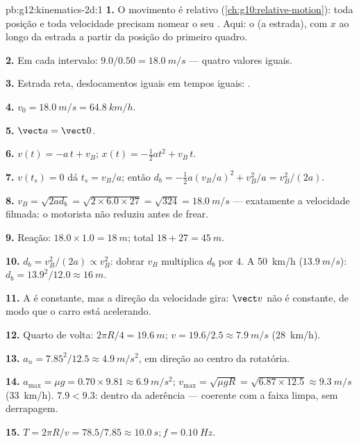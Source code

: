 \begin{solution}{pb:g12:kinematics-2d:1}
\textbf{1.} O movimento é relativo (\cref{ch:g10:relative-motion}): toda
posição e toda velocidade precisam nomear o seu . Aqui: o
 (a estrada), com $x$ ao longo da estrada a partir da
posição do primeiro quadro.

\textbf{2.} Em cada intervalo: $9.0/0.50 = \qty{18.0}{m/s}$ --- quatro
valores iguais.

\textbf{3.} Estrada reta, deslocamentos iguais em tempos iguais:
.

\textbf{4.} $v_0 = \qty{18.0}{m/s} = \qty{64.8}{km/h}$.

\textbf{5.} $\vect a = \vect 0$.

\textbf{6.} $v(t) = -a\,t + v_B$; $x(t) = -\tfrac12 a t^2 + v_B\,t$.

\textbf{7.} $v(t_s) = 0$ dá $t_s = v_B/a$; então
$d_b = -\tfrac12 a (v_B/a)^2 + v_B^2/a = v_B^2/(2a)$.

\textbf{8.} $v_B = \sqrt{2 a d_b} = \sqrt{2 \times 6.0 \times 27} =
\sqrt{324} = \qty{18.0}{m/s}$ --- exatamente a velocidade filmada: o
motorista não reduziu antes de frear.

\textbf{9.} Reação: $18.0 \times 1.0 = \qty{18}{m}$; total
$18 + 27 = \qty{45}{m}$.

\textbf{10.} $d_b = v_B^2/(2a) \propto v_B^2$: dobrar $v_B$ multiplica
$d_b$ por $4$. A \qty{50}{km/h} ($\qty{13.9}{m/s}$):
$d_b = 13.9^2/12.0 \approx \qty{16}{m}$.

\textbf{11.} A  é constante, mas a direção da
velocidade gira: $\vect v$ não é constante, de modo que o carro está
acelerando.

\textbf{12.} Quarto de volta: $2\pi R/4 = \qty{19.6}{m}$;
$v = 19.6/2.5 \approx \qty{7.9}{m/s}$ (\qty{28}{km/h}).

\textbf{13.} $a_n = 7.85^2/12.5 \approx \qty{4.9}{m/s^2}$, em direção ao
centro da rotatória.

\textbf{14.} $a_{\max} = \mu g = 0.70 \times 9.81 \approx
\qty{6.9}{m/s^2}$;
$v_{\max} = \sqrt{\mu g R} = \sqrt{6.87 \times 12.5} \approx
\qty{9.3}{m/s}$ (\qty{33}{km/h}). $7.9 < 9.3$: dentro da aderência ---
coerente com a faixa limpa, sem derrapagem.

\textbf{15.} $T = 2\pi R/v = 78.5/7.85 \approx \qty{10.0}{s};
f = \qty{0.10}{Hz}$.


\end{solution}
